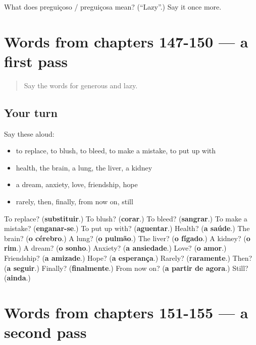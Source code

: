 \begin{tcolorbox}[breakable,colback=teal!4,colframe=teal!35!black,title={Before you move on}]
What does preguiçoso / preguiçosa mean? (\textquotedblleft{}Lazy\textquotedblright{}.) Say it once more.
\end{tcolorbox}
\section[(dialogue)]{Words from chapters 147-150 — a first pass}

\label{lesson:PT-R155-first-pass-words-from-chapters-147-150}



\begin{quote}
Say the words for generous and lazy.
\end{quote}

\subsection*{Your turn}
Say these aloud:

\begin{itemize}
\raggedright
  \item to replace, to blush, to bleed, to make a mistake, to put up with
  \item health, the brain, a lung, the liver, a kidney
  \item a dream, anxiety, love, friendship, hope
  \item rarely, then, finally, from now on, still
\end{itemize}

\begin{tcolorbox}[breakable,colback=teal!4,colframe=teal!35!black,title={Before you move on}]
To replace? (\textbf{substituir}.) To blush? (\textbf{corar}.) To bleed? (\textbf{sangrar}.) To make a mistake? (\textbf{enganar-se}.) To put up with? (\textbf{aguentar}.) Health? (\textbf{a saúde}.) The brain? (\textbf{o cérebro}.) A lung? (\textbf{o pulmão}.) The liver? (\textbf{o fígado}.) A kidney? (\textbf{o rim}.) A dream? (\textbf{o sonho}.) Anxiety? (\textbf{a ansiedade}.) Love? (\textbf{o amor}.) Friendship? (\textbf{a amizade}.) Hope? (\textbf{a esperança}.) Rarely? (\textbf{raramente}.) Then? (\textbf{a seguir}.) Finally? (\textbf{finalmente}.) From now on? (\textbf{a partir de agora}.) Still? (\textbf{ainda}.)
\end{tcolorbox}
\section[(dialogue)]{Words from chapters 151-155 — a second pass}


